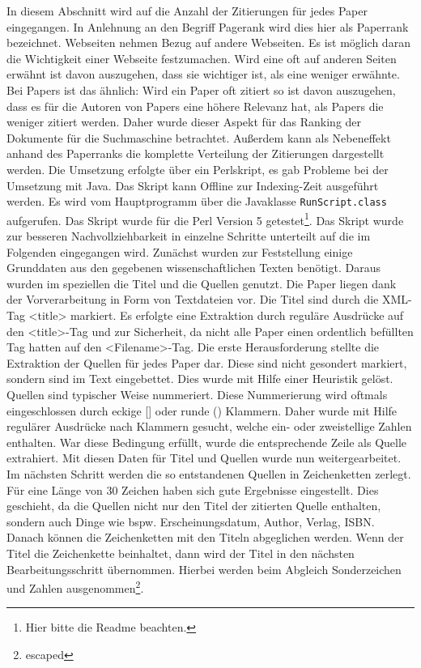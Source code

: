In diesem Abschnitt wird auf die Anzahl der Zitierungen für jedes Paper eingegangen. In Anlehnung an den Begriff Pagerank wird dies hier als Paperrank bezeichnet.
Webseiten nehmen Bezug auf andere Webseiten. Es ist möglich daran die Wichtigkeit einer Webseite festzumachen. Wird eine oft auf anderen Seiten erwähnt ist davon auszugehen, dass sie wichtiger ist, als eine weniger erwähnte. Bei Papers ist das ähnlich: Wird ein Paper oft zitiert so ist davon auszugehen, dass es für die Autoren von Papers eine höhere Relevanz hat, als Papers die weniger zitiert werden. Daher wurde dieser Aspekt für das Ranking der Dokumente für die Suchmaschine betrachtet. Außerdem kann als Nebeneffekt anhand des Paperranks die komplette Verteilung der Zitierungen dargestellt werden.
Die Umsetzung erfolgte über ein Perlskript, es gab Probleme bei der Umsetzung mit Java. Das Skript kann Offline zur Indexing-Zeit ausgeführt werden. Es wird vom Hauptprogramm über die Javaklasse \lstinline{RunScript.class} aufgerufen. Das Skript wurde für die Perl Version 5 getestet\footnote{Hier bitte die Readme beachten.}. Das Skript wurde zur besseren Nachvollziehbarkeit in einzelne Schritte unterteilt auf die im Folgenden eingegangen wird.
Zunächst wurden zur Feststellung einige Grunddaten aus den gegebenen wissenschaftlichen Texten benötigt. Daraus wurden im speziellen die Titel und die Quellen genutzt. Die Paper liegen dank der Vorverarbeitung in Form von Textdateien vor. Die Titel sind durch die XML-Tag <title> markiert. Es erfolgte eine Extraktion durch reguläre Ausdrücke auf den <title>-Tag und zur Sicherheit, da nicht alle Paper einen ordentlich befüllten Tag hatten auf den <Filename>-Tag. 
Die erste Herausforderung stellte die Extraktion der Quellen für jedes Paper dar. Diese sind nicht gesondert markiert, sondern sind im Text eingebettet. Dies wurde mit Hilfe einer Heuristik gelöst. Quellen sind typischer Weise nummeriert. Diese Nummerierung wird oftmals eingeschlossen durch eckige [] oder runde () Klammern. Daher wurde mit Hilfe regulärer Ausdrücke nach Klammern gesucht, welche ein- oder zweistellige Zahlen enthalten. War diese Bedingung erfüllt, wurde die entsprechende Zeile als Quelle extrahiert. Mit diesen Daten für Titel und Quellen wurde nun weitergearbeitet.
Im nächsten Schritt werden die so entstandenen Quellen in Zeichenketten zerlegt. Für eine Länge von 30 Zeichen haben sich gute Ergebnisse eingestellt. Dies geschieht, da die Quellen nicht nur den Titel der zitierten Quelle enthalten, sondern auch Dinge wie bspw. Erscheinungsdatum, Author, Verlag, ISBN. 
Danach können die Zeichenketten mit den Titeln abgeglichen werden. Wenn der Titel die Zeichenkette beinhaltet, dann wird der Titel in den nächsten Bearbeitungsschritt übernommen. Hierbei werden beim Abgleich Sonderzeichen und Zahlen ausgenommen\footnote{escaped}.
